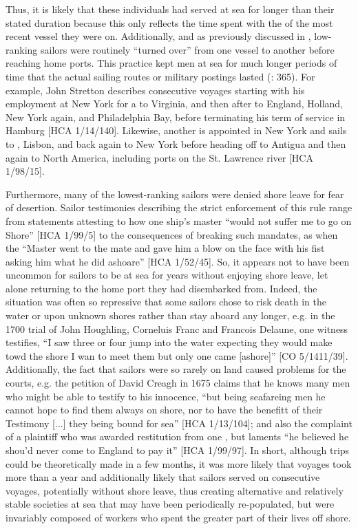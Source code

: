 Thus, it is likely that these individuals had served at sea for longer than their stated duration because this only reflects the time spent with the  of the most recent vessel they were on. Additionally, and as previously discussed in , low-ranking sailors were routinely “turned over” from one vessel to another before reaching home ports. This practice kept men at sea for much longer periods of time that the actual sailing routes or military postings lasted (\citealt{AdkinsAdkins2008}: 365). For example, John Stretton describes consecutive voyages starting with his employment at New York for a  to Virginia, and then after to England, Holland, New York again, and Philadelphia Bay, before terminating his term of service in Hamburg [HCA 1/14/140]. Likewise, another  is appointed in New York and sails to , Lisbon, and back again to New York before heading off to Antigua and then again to North America, including ports on the St. Lawrence river [HCA 1/98/15]. 

Furthermore, many of the lowest-ranking sailors were denied shore leave for fear of desertion. Sailor testimonies describing the strict enforcement of this rule range from statements attesting to how one ship’s master “would not suffer me to go on Shore” [HCA 1/99/5] to the consequences of breaking such mandates, as when the “Master went to the mate and gave him a blow on the face with his fist asking him what he did ashoare” [HCA 1/52/45]. So, it appears not to have been uncommon for sailors to be at sea for years without enjoying shore leave, let alone returning to the home port they had disembarked from. Indeed, the situation was often so repressive that some sailors chose to risk death in the water or upon unknown shores rather than stay aboard any longer, e.g. in the 1700 trial of John Houghling, Corneluis Franc and Francois Delaune, one witness testifies, “I saw three or four jump into the water expecting they would make towd the shore I wan to meet them but only one came [ashore]” [CO 5/1411/39]. Additionally, the fact that sailors were so rarely on land caused problems for the courts, e.g. the petition of David Creagh in 1675 claims that he knows many men who might be able to testify to his innocence, “but being seafareing men he cannot hope to find them always on shore, nor to have the benefitt of their Testimony [...] they being bound for sea” [HCA 1/13/104]; and also the complaint of a plaintiff who was awarded restitution from one , but laments “he believed he shou’d never come to England to pay it”  [HCA 1/99/97]. In short, although  trips could be theoretically made in a few months, it was more likely that voyages took more than a year and additionally likely that sailors served on consecutive voyages, potentially without shore leave, thus creating alternative and relatively stable societies at sea that may have been periodically re-populated, but were invariably composed of workers who spent the greater part of their lives off shore. 

